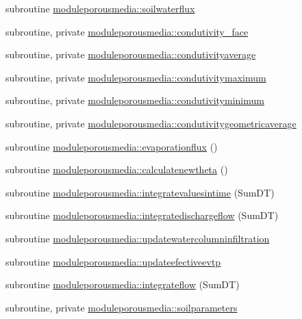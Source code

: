 \begin{DoxyCompactItemize}
\item 
subroutine \mbox{\hyperlink{namespacemoduleporousmedia_ad749502c076b86d6579522e1a1377e65}{moduleporousmedia\+::soilwaterflux}}
\item 
subroutine, private \mbox{\hyperlink{namespacemoduleporousmedia_a702433cf8268af2b48ad2dff405d1202}{moduleporousmedia\+::condutivity\+\_\+face}}
\item 
subroutine, private \mbox{\hyperlink{namespacemoduleporousmedia_af9319c9dde3c764e53801191ae902220}{moduleporousmedia\+::condutivityaverage}}
\item 
subroutine, private \mbox{\hyperlink{namespacemoduleporousmedia_ae2e67be2f15dbdf148268d5b0fe82c68}{moduleporousmedia\+::condutivitymaximum}}
\item 
subroutine, private \mbox{\hyperlink{namespacemoduleporousmedia_acd65a0f6af171e6aea2cd5784f58fcc3}{moduleporousmedia\+::condutivityminimum}}
\item 
subroutine, private \mbox{\hyperlink{namespacemoduleporousmedia_addae947f6fd1fa818093524bef8b0716}{moduleporousmedia\+::condutivitygeometricaverage}}
\item 
subroutine \mbox{\hyperlink{namespacemoduleporousmedia_a9e2789b14ba4547dcad30834e1068477}{moduleporousmedia\+::evaporationflux}} ()
\item 
subroutine \mbox{\hyperlink{namespacemoduleporousmedia_a659c3fab21d457aee320269fbc101787}{moduleporousmedia\+::calculatenewtheta}} ()
\item 
subroutine \mbox{\hyperlink{namespacemoduleporousmedia_a65ff629d0c1ef9ecd5231bc72cc38c06}{moduleporousmedia\+::integratevaluesintime}} (Sum\+DT)
\item 
subroutine \mbox{\hyperlink{namespacemoduleporousmedia_ad3dd92d2f8b726911dbb895f480b0725}{moduleporousmedia\+::integratedischargeflow}} (Sum\+DT)
\item 
subroutine \mbox{\hyperlink{namespacemoduleporousmedia_a5232e9d01e4dffac7d88f9b9d10ddc3f}{moduleporousmedia\+::updatewatercolumninfiltration}}
\item 
subroutine \mbox{\hyperlink{namespacemoduleporousmedia_a06efe35a5a85d34f8db82ebe144c1def}{moduleporousmedia\+::updateefectiveevtp}}
\item 
subroutine \mbox{\hyperlink{namespacemoduleporousmedia_ab03d5744de85ffec6652ff0b88896f38}{moduleporousmedia\+::integrateflow}} (Sum\+DT)
\item 
subroutine, private \mbox{\hyperlink{namespacemoduleporousmedia_ac37dcb693dc313ce78306c5294823662}{moduleporousmedia\+::soilparameters}}

\end{DoxyCompactItemize}
